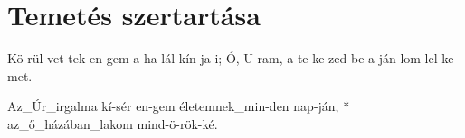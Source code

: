 \documentclass[twoside]{article}
\begin{document}
\section*{Temetés szertartása}

\begin{gregosheet}
            {   Kö-rül vet-tek en-gem a ha-lál kín-ja-i;  Ó, U-ram, a te ke-zed-be  a-ján-lom lel-ke-met.}
\end{gregosheet}

\begin{gregosheet}
            {   Az_Úr_irgalma kí-sér en-gem életemnek_min-den nap-ján, * az_ő_házában_lakom mind-ö-rök-ké.}
\end{gregosheet}
\end{document}

